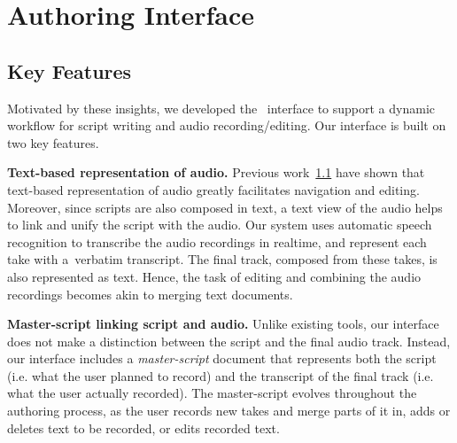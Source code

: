 \section{Authoring Interface}
\subsection{Key Features} Motivated by these insights, we developed the \systemname\  interface to support a dynamic workflow for script writing and  audio recording/editing. Our interface is built on two key features. 


\textbf{Text-based representation of audio.} Previous work~\ref{} have shown that text-based representation of audio greatly facilitates navigation and editing. Moreover, since scripts are also composed in text, a text view of the audio  helps to link and unify the script
with the audio.
 Our system uses automatic speech recognition to transcribe the audio recordings in realtime, and represent each take with a\ verbatim transcript. The final track, composed from these takes, is also represented as text. Hence, the task of editing and combining the audio recordings becomes akin to merging text documents. 

\textbf{Master-script linking script and audio.} Unlike existing tools, our interface does not make a distinction between the script and the final audio track. Instead, our interface includes a \textit{master-script} document that represents both the script (i.e. what the user planned to record) and the transcript of the final track (i.e. what the user actually recorded). The master-script evolves throughout the authoring process, as the user records new takes and merge parts of it in, adds or deletes text to be recorded, or edits recorded text. 


